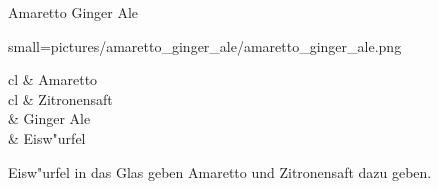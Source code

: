 \begin{recipe}
	[
	preparationtime = {\unit[5]{min}},
	bakingtime,
	bakingtemperature,
	portion = {\portion{1}},
	calory,
	source
	]
	{Amaretto Ginger Ale}
	
	\graph
	{
		small=pictures/amaretto_ginger_ale/amaretto_ginger_ale.png
	}
	
	\ingredients
	{
		\unit[40]{cl} & Amaretto \\
		\unit[20]{cl} & Zitronensaft \\
		& Ginger Ale \\
		& Eisw"urfel
	}
	
	\preparation
	{
		\step Eisw"urfel in das Glas geben
		\step Amaretto und Zitronensaft dazu geben.
	}
\end{recipe}